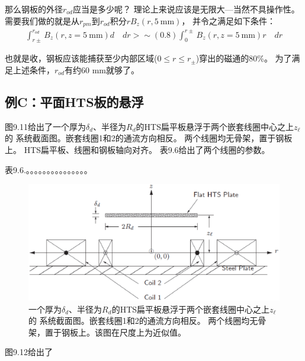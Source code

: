 那么钢板的外径$r_{od}$应当是多少呢？
理论上来说应该是无限大---当然不具操作性。
需要我们做的就是从$r_{pm}$到$r_{od}$积分$rB_z(r,5\ \mathrm{mm})$，
并令之满足如下条件：
\begin{align*}%
\int_{r\pm}^{r_{od}}B_{z}(r,z=5\ \mathrm{ mm})d\quad dr>\sim(0.8)\int_{0}^{r\pm}B_{z}(r,z=5\ \mathrm{ mm})r\quad dr
\end{align*}

也就是收，钢板应该能捕获至少内部区域($0\le r\le r_{\pm}$)穿出的磁通的80\%。
为了满足上述条件，$r_{od}$有约60 mm就够了。


\subsection{例C：平面HTS板的悬浮}
图9.11给出了一个厚为$\delta_d$、半径为$R_d$的HTS扁平板悬浮于两个嵌套线圈中心之上$z_\ell$的
系统截面图。嵌套线圈1和2的通流方向相反。
两个线圈均无骨架，置于钢板上。
HTS扁平板、线圈和钢板轴向对齐。
表9.6给出了两个线圈的参数。

表9.6.。。。。。。。。。。。。。。。

\begin{figure}
	\centering
	\includegraphics[scale=0.5]{chpt9/figs/fig9.11.eps}
	\caption{一个厚为$\delta_d$、半径为$R_d$的HTS扁平板悬浮于两个嵌套线圈中心之上$z_\ell$的
		系统截面图。嵌套线圈1和2的通流方向相反。
		两个线圈均无骨架，置于钢板上。该图在尺度上为近似值。}
\end{figure}

图9.12给出了


